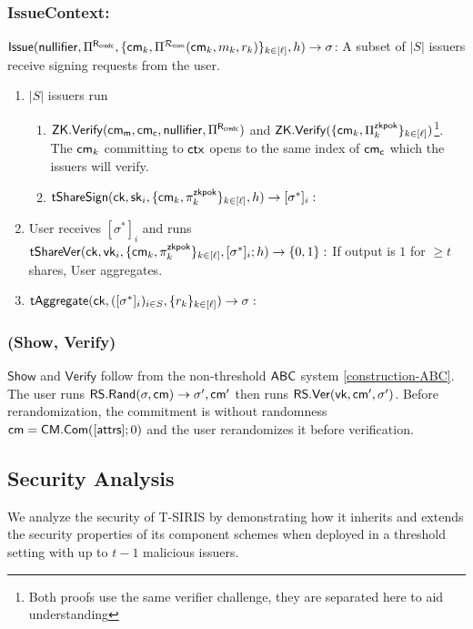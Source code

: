 \subsubsection{IssueContext:}
$\mathsf{Issue}(\mathsf{nullifier}, \Pi^{\mathsf{R}_{\mathsf{credc}}}, \{\mathsf{cm}_k, \Pi^{\mathcal{R}_{\mathsf{com}}}(\mathsf{cm}_k, m_k, r_k)\}_{k \in [\ell]}, h) \to \sigma$: A subset of $|S|$ issuers receive signing requests from the user. 
\begin{enumerate}
    \item $|S|$ issuers run 
    \begin{enumerate}
        \item $\mathsf{ZK.Verify}(\mathsf{cm_m}, \mathsf{cm_c}, \mathsf{nullifier}, \Pi^{\mathsf{R}_{\mathsf{credc}}})$ and $\mathsf{ZK.Verify}(\{\mathsf{cm}_k, \Pi_k^{\mathsf{zkpok}}\}_{k \in [\ell]})$\footnote{Both proofs use the same verifier challenge, they are separated here to aid understanding}. The $\mathsf{cm}_k$ committing to $\mathsf{ctx}$ opens to the same index of $\mathsf{cm_c}$ which the issuers will verify.
        \item $\mathsf{tShareSign}(\mathsf{ck}, \mathsf{sk}_i, \{\mathsf{cm}_k, \pi_k^{\mathsf{zkpok}}\}_{k \in [\ell]}, h) \to [\sigma^*]_i:$
    \end{enumerate}
    \item User receives $[\sigma^*]_i$ and runs $\mathsf{tShareVer}(\mathsf{ck}, \mathsf{vk}_i, \{\mathsf{cm}_k, \pi_k^{\mathsf{zkpok}}\}_{k \in [\ell]}, [\sigma^*]_i; h) \to \{0,1\}:$ If output is $1$ for $\geq t$ shares, User aggregates.
    \item $\mathsf{tAggregate}(\mathsf{ck}, ([\sigma^*]_i)_{i \in S}, \{r_k\}_{k \in [\ell]}) \to \sigma:$
\end{enumerate}

\subsubsection*{(Show, Verify)}
$\mathsf{Show}$ and $\mathsf{Verify}$ follow from the non-threshold $\mathsf{ABC}$ system \ref{construction-ABC}. The user runs $\mathsf{RS.Rand}(\sigma, \mathsf{cm}) \to \sigma', \mathsf{cm}'$ then runs $\mathsf{RS.Ver}(\mathsf{vk}, \mathsf{cm}', \sigma')$. Before rerandomization, the commitment is without randomness $\mathsf{cm} = \mathsf{CM.Com}([\mathsf{attrs}]; 0)$ and the user rerandomizes it before verification.


\subsection{Security Analysis}
\label{sec:chap5-threshold-security}

We analyze the security of T-SIRIS by demonstrating how it inherits and extends the security properties of its component schemes when deployed in a threshold setting with up to $t-1$ malicious issuers.

